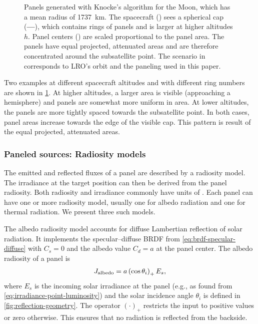 \begin{figure}[t]
   \caption{Panels generated with Knocke's algorithm for the Moon, which has a mean radius of \qty{1737}{\km}. The spacecraft (\textcolor{mpl-pink}{}) sees a spherical cap (\textcolor{mpl-red}{\textbf{---}}), which contains rings of panels and is larger at higher altitudes $h$. Panel centers (\textcolor{mpl-lightblue}{}) are scaled proportional to the panel area. The panels have equal projected, attenuated areas and are therefore concentrated around the subsatellite point. The scenario in \protect{} corresponds to LRO's orbit and the paneling used in this paper.}
   \label{fig:general-knocke-paneling}
\end{figure}

Two examples at different spacecraft altitudes and with different ring numbers are shown in \cref{fig:general-knocke-paneling}. At higher altitudes, a larger area is visible (approaching a hemisphere) and panels are somewhat more uniform in area. At lower altitudes, the panels are more tightly spaced towards the subsatellite point. In both cases, panel areas increase towards the edge of the visible cap. This pattern is result of the equal projected, attenuated areas.

\subsubsection{Paneled sources: Radiosity models}
The emitted and reflected fluxes of a panel are described by a radiosity model. The irradiance at the target position can then be derived from the panel radiosity. Both radiosity and irradiance commonly have units of \unit{\irr}. Each panel can have one or more radiosity model, usually one for albedo radiation and one for thermal radiation. We present three such models.

The albedo radiosity model accounts for diffuse Lambertian reflection of solar radiation. It implements the specular--diffuse \gls{BRDF} from \cref{eq:brdf-specular-diffuse} with $C_s = 0$ and the albedo value $C_d = a$ at the panel center. The albedo radiosity of a panel is~\cite{Knocke1988}
\begin{align}
    \label{eq:radiosity-albedo}
    J_\textnormal{albedo} = a \left(\cos\theta_i\right)_+ E_s,
\end{align}
where $E_s$ is the incoming solar irradiance at the panel (e.g., as found from \cref{eq:irradiance-point-luminosity}) and the solar incidence angle $\theta_i$ is defined in \cref{fig:reflection-geometry}. The operator $(\cdot)_+$ restricts the input to positive values or zero otherwise. This ensures that no radiation is reflected from the backside.

